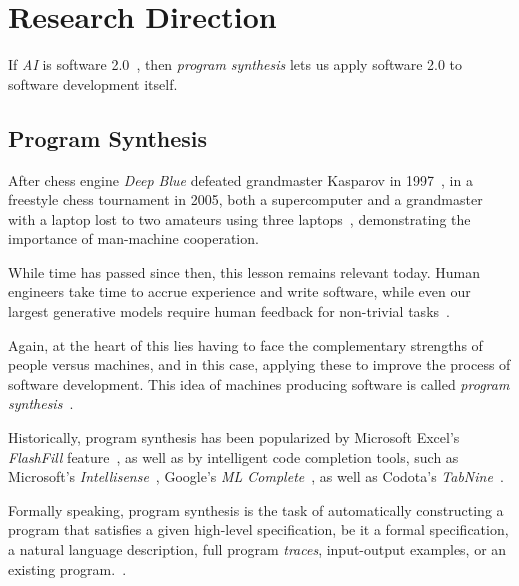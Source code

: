 \documentclass{article}
\begin{document}
\section{Research Direction} %

If \emph{AI} is software 2.0~\citep{software20},
then \emph{program synthesis} lets us apply software 2.0 to software development itself.

\subsection{Program Synthesis}


After chess engine \emph{Deep Blue} defeated grandmaster Kasparov in 1997~\citep{deepblue},
in a freestyle chess tournament in 2005,
both a supercomputer and a grandmaster with a laptop lost to two amateurs using three laptops~\citep{kasparov},
demonstrating the importance of man-machine cooperation.

While time has passed since then, this lesson remains relevant today.
Human engineers take time to accrue experience and write software,
while even our largest generative models require human feedback for non-trivial tasks~\citep{gpt3code}.

Again, at the heart of this lies having to face the complementary strengths of people versus machines,
and in this case, applying these to improve the process of software development.
This idea of machines producing software is called \emph{program synthesis}~\citep{church1957applications}.


Historically, program synthesis has been popularized by
Microsoft Excel's \emph{FlashFill} feature~\citep{flashfill},
as well as by intelligent code completion tools,
such as Microsoft's \emph{Intellisense}~\citep{intellisense},
Google's \emph{ML Complete}~\citep{mlcomplete},
as well as Codota's \emph{TabNine}~\citep{tabnine}.

Formally speaking, program synthesis is the task of automatically constructing a program
that satisfies a given high-level specification,
be it a formal specification, a natural language description,
full program \emph{traces}, input-output examples,
or an existing program.~\citep{gulwani2017program}.
\end{document}
